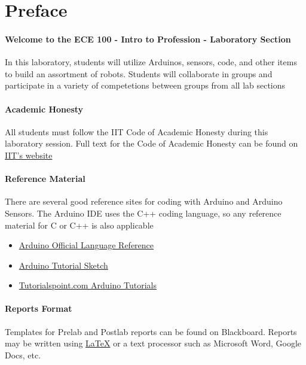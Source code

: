 \documentclass[]{report}
\begin{document}
	
\section{Preface}

\paragraph{Welcome to the ECE 100 - Intro to Profession - Laboratory Section}{
In this laboratory, students will utilize Arduinos, sensors, code, and other items to build an assortment of robots. Students will collaborate in groups and participate in a variety of competetions between groups from all lab sections}

\paragraph{Academic Honesty}{
All students must follow the IIT Code of Academic Honesty during this laboratory session. Full text for the Code of Academic Honesty can be found on \href{https://www.iit.edu/student-affairs/student-handbook/fine-print/code-academic-honesty}{IIT's website}}

\paragraph{Reference Material}{
There are several good reference sites for coding with Arduino and Arduino Sensors. The Arduino IDE uses the C++ coding language, so any reference material for C or C++ is also applicable
\begin{itemize}
	\item \href{https://www.arduino.cc/reference/en/}{Arduino Official Language Reference}
	\item \href{https://www.arduino.cc/en/tutorial/sketch}{Arduino Tutorial Sketch}
	\item \href{https://www.tutorialspoint.com/arduino/index.htm}{Tutorialspoint.com Arduino Tutorials}
\end{itemize}
}

\paragraph{Reports Format}{ Templates for Prelab and Postlab reports can be found on Blackboard. Reports may be written using \href{https://www.latex-project.org/}{LaTeX} or a text processor such as Microsoft Word, Google Docs, etc.
}
\end{document}
